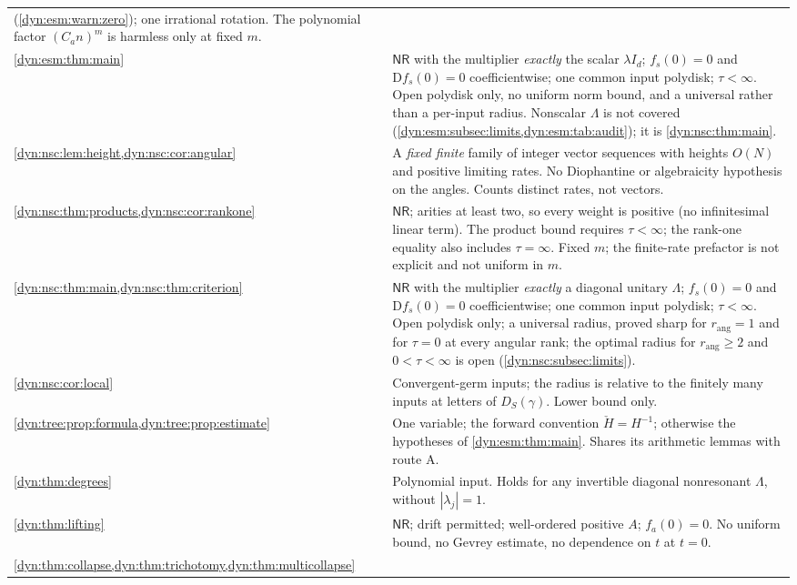 \documentclass[11pt,letterpaper]{article}
\theoremstyle{definition}
\theoremstyle{remark}
\newcommand{\nres}{\mathsf{NR}}
\newcommand{\rang}{r_{\mathrm{ang}}}
\numberwithin{equation}{section}
\begin{document}
\begin{longtable}{@{}P{0.26\textwidth}P{0.67\textwidth}@{}}
(\cref{dyn:esm:warn:zero}); one irrational rotation. The polynomial factor
$(C_an)^{m}$ is harmless only at fixed $m$.\\[3pt]
\cref{dyn:esm:thm:main} &
$\nres$ with the multiplier \emph{exactly} the scalar $\lambda I_d$;
$f_s(0)=0$ and $\mathrm Df_s(0)=0$ coefficientwise; one common input
polydisk; $\tau<\infty$. Open polydisk only, no uniform norm bound, and a
universal rather than a per-input radius. Nonscalar $\Lambda$ is not
covered (\cref{dyn:esm:subsec:limits,dyn:esm:tab:audit}); it is
\cref{dyn:nsc:thm:main}.\\[3pt]
\cref{dyn:nsc:lem:height,dyn:nsc:cor:angular} &
A \emph{fixed finite} family of integer vector sequences with heights
$O(N)$ and positive limiting rates. No Diophantine or algebraicity
hypothesis on the angles. Counts distinct rates, not vectors.\\[3pt]
\cref{dyn:nsc:thm:products,dyn:nsc:cor:rankone} &
$\nres$; arities at least two, so every weight is positive
(no infinitesimal linear term). The product bound requires $\tau<\infty$;
the rank-one equality also includes $\tau=\infty$. Fixed $m$; the finite-rate
prefactor is not explicit and not uniform in $m$.\\[3pt]
\cref{dyn:nsc:thm:main,dyn:nsc:thm:criterion} &
$\nres$ with the multiplier \emph{exactly} a diagonal unitary $\Lambda$;
$f_s(0)=0$ and $\mathrm Df_s(0)=0$ coefficientwise; one common input
polydisk; $\tau<\infty$. Open polydisk only; a universal radius, proved
sharp for $\rang=1$ and for $\tau=0$ at every angular rank; the optimal
radius for $\rang\ge2$ and $0<\tau<\infty$ is open
(\cref{dyn:nsc:subsec:limits}).\\[3pt]
\cref{dyn:nsc:cor:local} &
Convergent-germ inputs; the radius is relative to the finitely many inputs
at letters of $D_S(\gamma)$. Lower bound only.\\[3pt]
\cref{dyn:tree:prop:formula,dyn:tree:prop:estimate} &
One variable; the forward convention $\check H=H^{-1}$; otherwise the
hypotheses of \cref{dyn:esm:thm:main}. Shares its arithmetic lemmas with
route A.\\[3pt]
\cref{dyn:thm:degrees} &
Polynomial input. Holds for any invertible diagonal nonresonant $\Lambda$,
without $|\lambda_j|=1$.\\[3pt]
\cref{dyn:thm:lifting} &
$\nres$; drift permitted; well-ordered positive $A$; $f_a(0)=0$. No
uniform bound, no Gevrey estimate, no dependence on $t$ at $t=0$.\\[3pt]
\cref{dyn:thm:collapse,dyn:thm:trichotomy,dyn:thm:multicollapse} &

\end{longtable}
\end{document}
